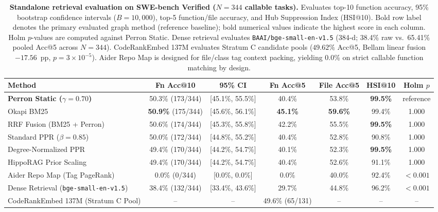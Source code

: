 \documentclass[10pt]{article}
\begin{document}
\begin{table}[!htbp]
\centering
\footnotesize
\setlength{\tabcolsep}{4.5pt}
\renewcommand{\arraystretch}{0.95}
\caption{\textbf{Standalone retrieval evaluation on SWE-bench Verified ($N=344$ callable tasks).} Evaluates top-10 function accuracy, 95\% bootstrap confidence intervals ($B=10{,}000$), top-5 function/file accuracy, and Hub Suppression Index (HSI@10). Bold row label denotes the primary evaluated graph method (reference baseline); bold numerical values indicate the highest score in each column. Holm $p$-values are computed against Perron Static. Dense retrieval evaluates \texttt{BAAI/bge-small-en-v1.5} (384-d; 38.4\% raw vs.\ 65.41\% pooled Acc@5 across $N=344$). CodeRankEmbed 137M evaluates Stratum C candidate pools ($49.62\%$ Acc@5, Bellam linear fusion $-17.56$~pp, $p=3\times 10^{-5}$). Aider Repo Map is designed for file/class tag context packing, yielding 0.0\% on strict callable function matching by design.}
\label{tab:verified_retrieval}
\begin{tabular}{l c c c c c c}
\toprule
\textbf{Method} & \textbf{Fn Acc@10} & \textbf{95\% CI} & \textbf{Fn Acc@5} & \textbf{File Acc@5} & \textbf{HSI@10} & \textbf{Holm $p$} \\
\midrule
\textbf{Perron Static ($\gamma=0.70$)} & 50.3\% (173/344) & [45.1\%, 55.5\%] & 40.4\% & 53.8\% & \textbf{99.5\%} & reference \\
Okapi BM25 & \textbf{50.9\%} (175/344) & [45.6\%, 56.1\%] & \textbf{45.1\%} & \textbf{59.6\%} & 99.4\% & 1.000 \\
RRF Fusion (BM25 + Perron) & 50.6\% (174/344) & [45.3\%, 55.8\%] & 42.2\% & 55.5\% & \textbf{99.5\%} & 1.000 \\
Standard PPR ($\beta=0.85$) & 50.0\% (172/344) & [44.8\%, 55.2\%] & 40.4\% & 52.8\% & 90.8\% & 1.000 \\
Degree-Normalized PPR & 49.4\% (170/344) & [44.2\%, 54.7\%] & 40.1\% & 52.3\% & \textbf{99.5\%} & 1.000 \\
HippoRAG Prior Scaling & 49.4\% (170/344) & [44.2\%, 54.7\%] & 40.4\% & 52.6\% & 91.1\% & 1.000 \\
Aider Repo Map (Tag PageRank) & 0.0\% (0/344) & [0.0\%, 0.0\%] & 0.0\% & 40.0\% & 92.4\% & $<0.001$ \\
Dense Retrieval (\texttt{bge-small-en-v1.5}) & 38.4\% (132/344) & [33.4\%, 43.6\%] & 29.7\% & 44.8\% & 96.2\% & $<0.001$ \\
CodeRankEmbed 137M (Stratum C Pool) & -- & -- & 49.6\% (65/131) & -- & -- & -- \\
\bottomrule
\end{tabular}
\end{table}
\end{document}
